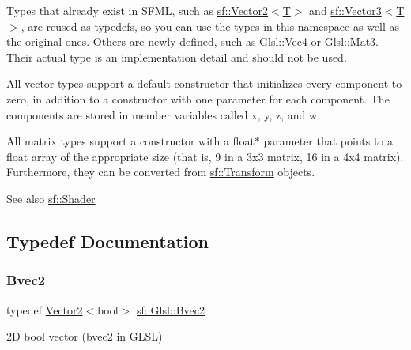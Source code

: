 Types that already exist in S\+F\+ML, such as \mbox{\hyperlink{classsf_1_1_vector2}{sf\+::\+Vector2$<$\+T$>$}} and \mbox{\hyperlink{classsf_1_1_vector3}{sf\+::\+Vector3$<$\+T$>$}}, are reused as typedefs, so you can use the types in this namespace as well as the original ones. Others are newly defined, such as Glsl\+::\+Vec4 or Glsl\+::\+Mat3. Their actual type is an implementation detail and should not be used.

All vector types support a default constructor that initializes every component to zero, in addition to a constructor with one parameter for each component. The components are stored in member variables called x, y, z, and w.

All matrix types support a constructor with a float$\ast$ parameter that points to a float array of the appropriate size (that is, 9 in a 3x3 matrix, 16 in a 4x4 matrix). Furthermore, they can be converted from \mbox{\hyperlink{classsf_1_1_transform}{sf\+::\+Transform}} objects.

\begin{DoxySeeAlso}{See also}
\mbox{\hyperlink{classsf_1_1_shader}{sf\+::\+Shader}} \begin{DoxyVerb}\end{DoxyVerb}
 
\end{DoxySeeAlso}


\subsection{Typedef Documentation}
\mbox{\label{namespacesf_1_1_glsl_a59d8cf909c3d71ebf3db057480b464da}} 
\subsubsection{\texorpdfstring{Bvec2}{Bvec2}}
{\footnotesize\ttfamily typedef \mbox{\hyperlink{classsf_1_1_vector2}{Vector2}}$<$bool$>$ \mbox{\hyperlink{namespacesf_1_1_glsl_a59d8cf909c3d71ebf3db057480b464da}{sf\+::\+Glsl\+::\+Bvec2}}}



2D bool vector ({\ttfamily bvec2} in G\+L\+SL) 

\begin{DoxyVerb}\end{DoxyVerb}
 \mbox{\label{namespacesf_1_1_glsl_a4166ffc506619b4912d576e6eba2c957}} 
